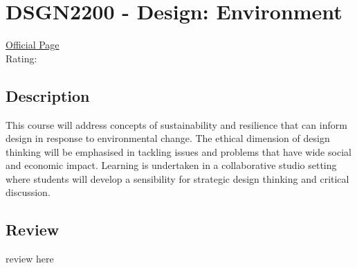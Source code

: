 \hypertarget{DSGN2200}{\section{DSGN2200 - Design: Environment}}

\large
\textcolor{turbo_purple}{\href{https://my.uq.edu.au/programs-courses/course.html?course_code=DSGN2200}{Official Page}} \\
Rating: \cstar\cstar\cstar\cstar\ostar

\normalsize
\subsection*{Description}
This course will address concepts of sustainability and resilience that can inform design in response to environmental change.
The ethical dimension of design thinking will be emphasised in tackling issues and problems that have wide social and economic impact.
Learning is undertaken in a collaborative studio setting where students will develop a sensibility for strategic design thinking and critical discussion.

\subsection*{Review}
review here
